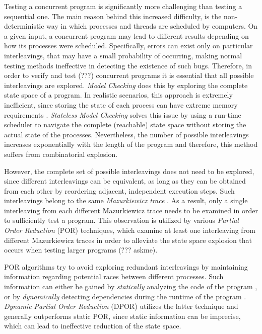 Testing a concurrent program is significantly more challenging than testing a sequential one.
The main reason behind this increased difficulty, is the non-deterministic way in which processes and
threads are scheduled by computers. On a given input, a concurrent program may lead to different 
results depending on how its processes were scheduled. Specifically, errors can exist only on particular
interleavings, that may have a small probability of occurring, making normal testing methods ineffective in
detecting the existence of such bugs. Therefore, in order to verify and test (???) concurrent programs it is
essential that all possible interleavings are explored. \textit{Model Checking} does this by exploring the
complete state space of a program. In realistic scenarios, this approach is extremely inefficient, since
storing the state of each process can have extreme memory requirements \cite{Godefroid:1997:MCP:263699.263717}.
\textit{Stateless Model
Checking} solves this issue by using a run-time scheduler to navigate the complete (reachable) state space 
without storing
the actual state of the processes. Nevertheless, the number of possible interleavings increases
exponentially with the length of the program and therefore, this method suffers from combinatorial explosion.

However, the complete set of possible interleavings does not need to be explored, since different
interleavings can be equivalent, as long as they can be obtained from each other by reordering adjacent, independent execution steps. 
Such interleavings belong to the same \textit{Mazurkiewicz trace} \cite{10.1007/3-540-17906-2_30}.
As a result, only a single interleaving from each different Mazurkiewicz trace needs to be examined in order
to sufficiently test a program. This observation is utilized by various \textit{Partial Order Reduction} (POR) \cite{Godefroid1996, POR, 
10.1007/3-540-53863-1_36}
techniques, which examine at least one interleaving from different Mazurkiewicz traces in order to alleviate 
the state space explosion that occurs when testing larger programs (??? askme).

POR algorithms try to avoid exploring redundant interleavings by maintaining information regarding potential races between different processes. 
Such information can either be gained by \textit{statically} analyzing the code of the program \cite{Static1997},
or by \textit{dynamically} detecting dependencies during the runtime of the program \cite{FlanaganDPOR}. \textit{Dynamic 
Partial Order Reduction} (DPOR) utilizes the latter technique and generally outperforms static POR,
since static information can be imprecise, which can lead to ineffective reduction of the state space.

